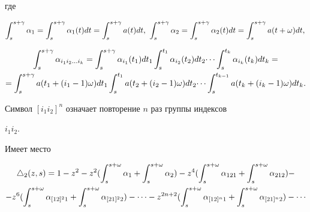 где


$$


\int_s^{s+\g}\alpha_1 =\int_s^{s+\g}\alpha_1(t)dt=\int_s^{s+\g}a(t)dt,\


\int_s^{s+\g}\alpha_2 =\int_s^{s+\g}\alpha_2(t)dt=


\int_s^{s+\g}a(t+\omega)dt,\\


$$


\begin{multline}


\int_s^{s+\g}\alpha_{i_1i_2\dots i_k}=\int_s^{s+\g}\alpha_{i_1}(t_1)dt_1


\int_s^{t_1}\alpha_{i_2}(t_2)dt_2\dots \int_s^{t_k}\alpha_{i_k}(t_k)dt_k =\\


%


=\int_s^{s+\g}a(t_1+(i_1-1)\omega)dt_1\int_s^{t_1}a(t_2+(i_2-1)\omega)dt_2


\dots\int_s^{t_{k-1}}a(t_k+(i_k-1)\omega)dt_k.


\end{multline}


Символ $[i_1i_2]^n$ означает повторение $n$ раз группы индексов


$i_1i_2$.





Имеет место





\begin{lem}


\begin{multline}


\tri_2(z,s)=1-z^2-z^2(\int_s^{s+\omega}\alpha_1+\int_s^{s+\omega}\alpha_2)


-z^4(\int_s^{s+\omega}\alpha_{121}+\int_s^{s+\omega}\alpha_{212})-\\


%


-z^6(\int_s^{s+\omega}\alpha_{[12]^21}+\int_s^{s+\omega}\alpha_{[21]^22})-


\dots-z^{2n+2}(\int_s^{s+\omega}\alpha_{[12]^n1}+


\int_s^{s+\omega}\alpha_{[21]^n2})-\dotsb


\end{multline}


\end{lem}





